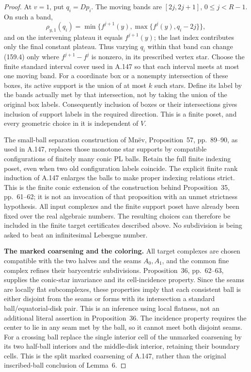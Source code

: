 \begin{proof}
At $v=1$, put $q_i=Dp_i$. The moving bands are
$[2j,2j+1]$, $0\le j<R-1$. On such a band,
\[
 \rho_{y,1}(q_i)=
 \min\{f^{j+1}(y),\max\{f^j(y),q_i-2j\}\},
\]
and on the intervening plateau it equals $f^{j+1}(y)$;
the last index contributes only the final constant plateau.
Thus varying $q_i$ within that band can change (159.4) only
where $f^{j+1}-f^j$ is nonzero, in its prescribed vertex star.
Choose the finite standard interval cover used in A.147 so
that each interval meets at most one moving band. For a
coordinate box or a nonempty intersection of these boxes,
its active support is the union of at most $k$ such stars.
Define its label by the bands actually met by that intersection,
not by taking the union of the original box labels. Consequently
inclusion of boxes or their intersections gives inclusion of
support labels in the required direction. This is a finite
poset, and every geometric choice in it is independent of $V$.

The small-ball separation construction of Mn\"ev,
Proposition~57, pp.~89--90, as used in A.147, replaces those
monotone star supports by compatible configurations of finitely
many conic PL balls. Retain the full finite indexing poset,
even when two old configuration labels coincide. The explicit
finite rank induction of A.147 enlarges the balls to make
proper indexing relations strict. This is the finite conic
extension of the construction behind Proposition~35,
pp.~61--62; it is not an invocation of that proposition with
an unmet strictness hypothesis. All input complexes and the
finite support poset have already been fixed over the real
algebraic numbers. The resulting choices can therefore be
included in the finite target certificates described above.
No subdivision is being asked to beat an infinitesimal
Lebesgue number.

\textbf{The marked coarsening and the coloring.}\quad
All target complexes are chosen compatible with the two
halves and the seams $A_0,A_1$, and the common fine complex
refines their barycentric subdivisions. Proposition~36,
pp.~62--63, supplies the conic-star invariance and its
cell-incidence property. Since the seams are locally flat
subcomplexes, these properties imply that each consistent
ball is either disjoint from the seams or forms with its
intersection a standard ball/equatorial-disk pair. This is
an inference using local flatness, not an additional literal
assertion in Proposition~36. The incidence property requires
the center to lie in any seam met by the ball, so it cannot
meet both disjoint seams.
For a crossing ball replace the single interior cell of the
unmarked coarsening by its two half-ball interiors and the
middle-disk interior, retaining their boundary cells. This
is the split marked coarsening of A.147, rather than the
original inscribed-ball conclusion of Lemma~6.


\end{proof}
